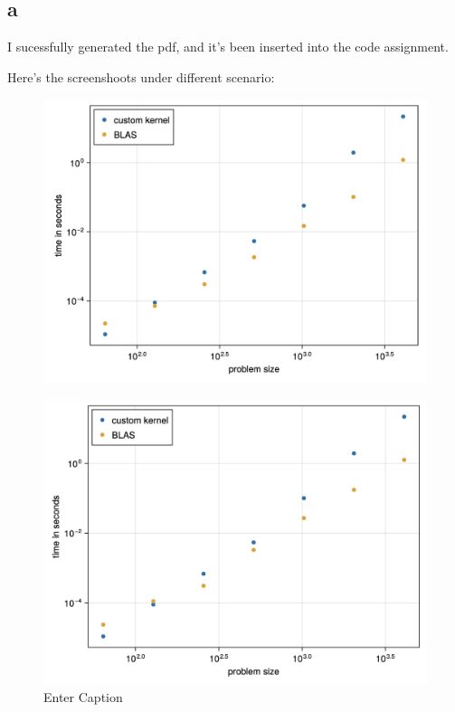 \documentclass{article}
\begin{document}
\subsection{a}
I sucessfully generated the pdf, and it's been inserted into the code assignment.\par
Here's the screenshoots under different scenario:
\begin{figure}[H]
    \centering
    \includegraphics[width=0.8\linewidth]{Photos/Image 2-6-24 at 07.12.jpeg}

\end{figure}
\begin{figure}
    \centering
    \includegraphics[width=0.8\linewidth]{Photos/Image 2-6-24 at 07.21.jpeg}
    \caption{Enter Caption}
    \label{fig:enter-label}
\end{figure}
\end{document}
